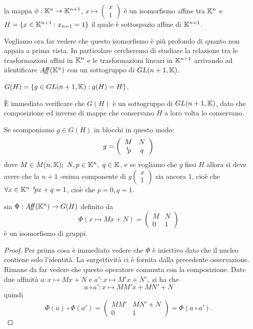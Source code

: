  \begin{remark}
 la mappa $\phi:\mathbb K^n\rightarrow \mathbb K^{n+1}$, $x\mapsto
 \left(\begin{smallmatrix}
	x \\
	1
	\end{smallmatrix}\right)$
è un isomorfismo affine tra $\mathbb K^n$ e
$H=\{x\in \mathbb K^{n+1} : x_{n+1}=1\}$ il quale è sottospazio affine di $\mathbb K^{n+1}$.
 \end{remark}
 
 Vogliamo ora far vedere che questo isomorfismo è più profondo di quanto non appaia a prima vista. In particolare cercheremo di studiare
 la relazione tra le trasformazioni affini in $\mathbb K^n$ e le trasformazioni lineari in $\mathbb K^{n+1}$ arrivando ad identificare
 $A\!f\!\!f(\mathbb K^n)$ con un sottogruppo di $GL(n+1,\mathbb K)$.
 
 \begin{definition}
  $G(H)=\{g\in GL(n+1,\mathbb K):g(H)=H\}$.
 \end{definition}
 
 \begin{remark}
 \`E immediato verificare che  $G(H)$ è un sottogruppo di  $GL(n+1,\mathbb K)$,
 dato che composizione ed inverse di mappe che conservano $H$ a loro volta lo conservano.
 \end{remark}
 
 \begin{remark}
 Se scomponiamo  $g\in G(H)$ in blocchi in questo modo:
 \[
	g = \left(
		\begin{array}{cc}
		M & N \\ 
		\, ^{t}\!p & q
		\end{array}
	\right)
 \]
  dove $M\in M(n,\mathbb K);\  N,p\in \mathbb K^n,\ q \in \mathbb K$, e se vogliamo che  $g$ fissi $H$
 allora si deve avere che la $n+1$ -esima componente di
 $g\left(\begin{smallmatrix}
	x \\
	1
	\end{smallmatrix}
	\right)$
 sia ancora $1$,
 cioè che  $\forall x\in \mathbb K^n\  \, ^{t}\!px+q=1$, cioè che $p=0, q=1$.
 \end{remark}
 
 \begin{proposition}
 sia  $\Phi:A\!f\!\!f(\mathbb K^n)\rightarrow G(H)$ definito da
 \[
	\Phi(x\mapsto Mx+N)=\left(
		\begin{array}{cc}
		M & N \\ 
		0 & 1
		\end{array}
	\right)
 \]
 è un isomorfismo di gruppi.
 \end{proposition}
 
 \begin{proof}
 Per prima cosa è immediato vedere che $\Phi$  è iniettivo dato che il nucleo contiene solo l'identità.
 La surgettività ci è fornita dalla precedente osservazione. Rimane da far vedere che questo operatore commuta con la composizione.
 Date due affinità $a:x\mapsto Mx+N$ e $a':x\mapsto M'x+N',$ si ha che
 \[
	a\circ a':x\mapsto MM'x+ MN'+N
 \]
 quindi
 \[
	\Phi(a)\circ\Phi(a')=\left(
		\begin{array}{cc}
		MM' & MN'+N \\ 
		0 & 1
		\end{array}
	\right)=\Phi(a\circ a').
 \]
 \end{proof}
 